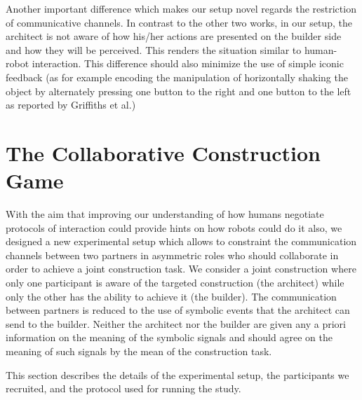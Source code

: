 Another important difference which makes our setup novel regards the restriction of communicative channels. In contrast to the other two works, in our setup, the architect is not aware of how his/her actions are presented on the builder side and how they will be perceived. This renders the situation similar to human-robot interaction. This difference should also minimize the use of simple iconic feedback (as for example encoding the manipulation of horizontally shaking the object by alternately pressing one button to the right and one button to the left as reported by Griffiths et al.)


\section{The Collaborative Construction Game}

With the aim that improving our understanding of how humans negotiate protocols of interaction could provide hints on how robots could do it also, we designed a new experimental setup which allows to constraint the communication channels between two partners in asymmetric roles who should collaborate in order to achieve a joint construction task. We consider a joint construction where only one participant is aware of the targeted construction (the architect) while only the other has the ability to achieve it (the builder). The communication between partners is reduced to the use of symbolic events that the architect can send to the builder. Neither the architect nor the builder are given any a priori information on the meaning of the symbolic signals and should agree on the meaning of such signals by the mean of the construction task.

This section describes the details of the experimental setup, the participants we recruited, and the protocol used for running the study.


